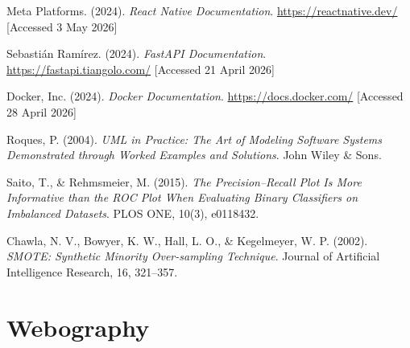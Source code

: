 \documentclass[12pt,a4paper]{report}
\begin{document}
\begin{enumerate}[label={[\arabic*]},leftmargin=1.6cm,itemsep=1.5pt,parsep=0pt,topsep=2pt]
  \item Meta Platforms. (2024). \textit{React Native Documentation}.
        \url{https://reactnative.dev/} [Accessed 3 May 2026]

  \item Sebastián Ramírez. (2024). \textit{FastAPI Documentation}.
        \url{https://fastapi.tiangolo.com/} [Accessed 21 April 2026]

  \item Docker, Inc. (2024). \textit{Docker Documentation}.
        \url{https://docs.docker.com/} [Accessed 28 April 2026]

  \item Roques, P. (2004). \textit{UML in Practice: The Art of Modeling Software Systems
        Demonstrated through Worked Examples and Solutions}. John Wiley \& Sons.

  \item Saito, T., \& Rehmsmeier, M. (2015). \textit{The Precision--Recall Plot Is More
        Informative than the ROC Plot When Evaluating Binary Classifiers on Imbalanced
        Datasets}. PLOS ONE, 10(3), e0118432.

  \item Chawla, N. V., Bowyer, K. W., Hall, L. O., \& Kegelmeyer, W. P. (2002).
        \textit{SMOTE: Synthetic Minority Over-sampling Technique}. Journal of Artificial
        Intelligence Research, 16, 321--357.

\end{enumerate}

\chapter*{Webography}
\end{document}
